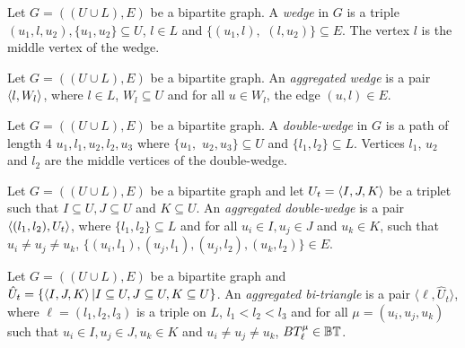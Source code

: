 \begin{definition}[Wedge]
Let $G=((U\cup L),E)$ be a bipartite graph. A  \textit{wedge} in $G$ is a triple $(u_1,l,u_2), \{u_1,u_2\}\subseteq U$, $l \in L$ and $\{(u_1,l),$ $(l,u_2)\} \subseteq E$. The vertex $l$ is the middle vertex of the wedge. 
\end{definition}
%   
\begin{definition}
Let $G=((U\cup L),E)$ be a bipartite graph. An  \textit{aggregated wedge} is a pair $\left\langle l, W_l \right\rangle$, where $l \in L$, $W_l \subseteq U$ and for all $u\in W_l$, the edge  $(u,l)\in E$. 
\end{definition}
%
\begin{definition}
Let $G=((U\cup L),E)$ be a bipartite graph. A \textit{double-wedge} in $G$ is a path of length 4 $u_1,l_1,u_2,l_2,u_3$ where  $\{u_1,$ $u_2,u_3\}\subseteq U$ and $\{l_1,l_2\}\subseteq L$. Vertices $l_1$, $u_2$ and $l_2$ are the middle vertices of the double-wedge. 
\end{definition}
%  
\begin{definition}
Let $G=((U\cup L),E)$ be a bipartite graph and let $U_t = \left\langle I, J, K\right\rangle$ be a triplet such that $I \subseteq U, J \subseteq U$ and $K \subseteq U$.  An \textit{aggregated double-wedge}  is a pair  $\left\langle (l_1, l_2), U_t \right\rangle$, where $\{l_1,l_2\}\subseteq L$ and  for all $u_i \in I, u_j \in J$ and $u_k \in K$, such that $u_i \neq u_j \neq u_k$, $\{(u_i, l_1), (u_j, l_1), (u_j, l_2), (u_k, l_2)\} \in E$.
\end{definition}
%
%
\begin{definition}
Let $G=((U\cup L),E)$ be a bipartite graph and  $\hat{U}_t=\{\left\langle I, J, K\right\rangle | I \subseteq U, J \subseteq U, K \subseteq U\}$. An \textit{aggregated bi-triangle}  is a pair  $\langle \ell, \hat{U}_t\rangle$, where $\ell=(l_1, l_2, l_3)$ is a triple on $L$, $l_1 < l_2 < l_3$ and for all $\mu=(u_i, u_j, u_k)$ such that $u_i \in I, u_j \in J, u_k \in K$ and $u_i \neq u_j \neq u_k$, $BT_{\ell}^{\mu}\in \mathbb{BT}$.
\end{definition}
